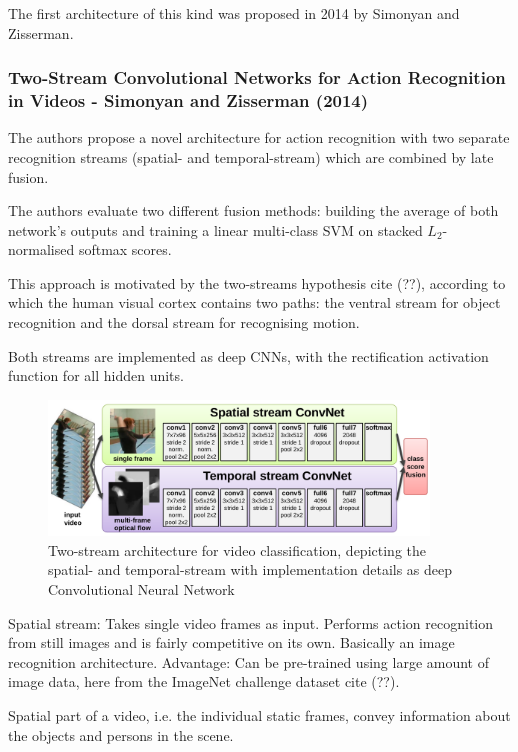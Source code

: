 The first architecture of this kind was proposed in 2014 by Simonyan and Zisserman.


\subsubsection{Two-Stream Convolutional Networks for Action Recognition in Videos - Simonyan and Zisserman (2014)}

The authors propose a novel architecture for action recognition with two separate recognition streams (spatial- and temporal-stream) which are combined by late fusion.

The authors evaluate two different fusion methods: building the average of both network's outputs and training a linear multi-class SVM on stacked $L_2$-normalised softmax scores.

This approach is motivated by the two-streams hypothesis cite (??), according to which the human visual cortex contains two paths: the ventral stream for object recognition and the dorsal stream for recognising motion.

Both streams are implemented as deep CNNs, with the rectification activation function for all hidden units.

\begin{figure}[H]
    \centering
    \includegraphics[width=0.9\textwidth]{img_deep/twostream_architecture}
    \caption{Two-stream architecture for video classification, depicting the spatial- and temporal-stream with implementation details as deep Convolutional Neural Network \cite{simonyan_two-stream_2014}}
    \label{fig:twostream_architecture}
\end{figure}

Spatial stream: Takes single video frames as input. Performs action recognition from still images and is fairly competitive on its own. Basically an image recognition architecture. Advantage: Can be pre-trained using large amount of image data, here from the ImageNet challenge dataset cite (??).

Spatial part of a video, i.e. the individual static frames, convey information about the objects and persons in the scene.


